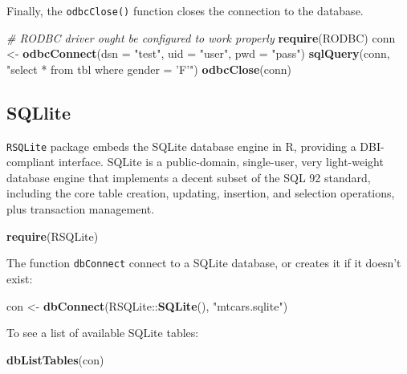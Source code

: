 \documentclass[]{book}
\newenvironment{Shaded}{\begin{snugshade}}{\end{snugshade}}
\newcommand{\KeywordTok}[1]{\textcolor[rgb]{0.13,0.29,0.53}{\textbf{{#1}}}}
\newcommand{\DataTypeTok}[1]{\textcolor[rgb]{0.13,0.29,0.53}{{#1}}}
\newcommand{\StringTok}[1]{\textcolor[rgb]{0.31,0.60,0.02}{{#1}}}
\newcommand{\CommentTok}[1]{\textcolor[rgb]{0.56,0.35,0.01}{\textit{{#1}}}}
\newcommand{\NormalTok}[1]{{#1}}
\begin{document}
Finally, the \texttt{odbcClose()} function closes the connection to the
database.

\begin{Shaded}
\begin{Highlighting}[]
\CommentTok{# RODBC driver ought be configured to work properly}
\KeywordTok{require}\NormalTok{(RODBC)}
\NormalTok{conn <-}\StringTok{ }\KeywordTok{odbcConnect}\NormalTok{(}\DataTypeTok{dsn =} \StringTok{"test"}\NormalTok{, }\DataTypeTok{uid =} \StringTok{"user"}\NormalTok{, }\DataTypeTok{pwd =} \StringTok{"pass"}\NormalTok{)}
\KeywordTok{sqlQuery}\NormalTok{(conn, }\StringTok{"select * from tbl where gender = 'F'"}\NormalTok{) }
\KeywordTok{odbcClose}\NormalTok{(conn)}
\end{Highlighting}
\end{Shaded}

\subsection{SQLlite}\label{sqllite}

\texttt{RSQLite} package embeds the SQLite database engine in R,
providing a DBI-compliant interface. SQLite is a public-domain,
single-user, very light-weight database engine that implements a decent
subset of the SQL 92 standard, including the core table creation,
updating, insertion, and selection operations, plus transaction
management.

\begin{Shaded}
\begin{Highlighting}[]
\KeywordTok{require}\NormalTok{(RSQLite)}
\end{Highlighting}
\end{Shaded}

The function \texttt{dbConnect} connect to a SQLite database, or creates
it if it doesn't exist:

\begin{Shaded}
\begin{Highlighting}[]
\NormalTok{con <-}\StringTok{ }\KeywordTok{dbConnect}\NormalTok{(RSQLite::}\KeywordTok{SQLite}\NormalTok{(), }\StringTok{"mtcars.sqlite"}\NormalTok{)}
\end{Highlighting}
\end{Shaded}

To see a list of available SQLite tables:

\begin{Shaded}
\begin{Highlighting}[]
\KeywordTok{dbListTables}\NormalTok{(con)}
\end{Highlighting}
\end{Shaded}
\end{document}
